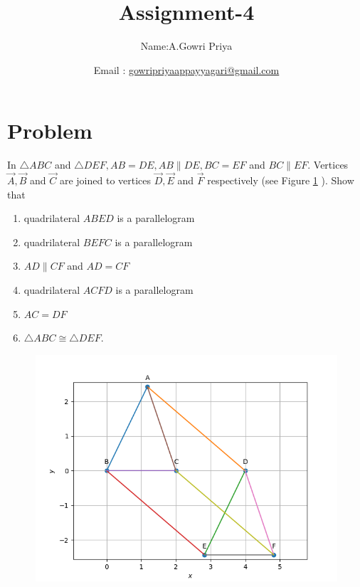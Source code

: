 \documentclass[10pt, a4paper]{article}
\begin{document}
\title{Assignment-4}
\author{Name:A.Gowri Priya\and Email :  \url{gowripriyaappayyagari@gmail.com}}
\date{}
\maketitle


  \section{Problem}
  \fi
In  $\triangle  ABC$ and  $\triangle DEF, AB = DE, AB \parallel DE, BC = EF$
and $BC \parallel EF$. Vertices $\vec{A},\vec{B}$ and $\vec{C}$
are joined to
vertices 
$\vec{D},\vec{E}$ and $\vec{F}$
respectively (see Figure 
		\ref{fig:9/8/1/11}
).
Show that
\begin{enumerate}
	\item  quadrilateral  $ABED$ is a parallelogram
	\item  quadrilateral  $BEFC$ is a parallelogram
	\item  $AD \parallel  CF $ and $AD = CF$
		\label{prob:9/8/1/11/3}
	\item  quadrilateral  $ACFD$ is a parallelogram
	\item $AC = DF$
	\item $\triangle ABC \cong \triangle  DEF$.
\end{enumerate}

 	\begin{figure}
		\centering
 \includegraphics[width=\columnwidth]{chapters/9/8/1/11/figs/fig.png} 
		\caption{}
		\label{fig:9/8/1/11}
  	\end{figure}
\iffalse
\end{document}

